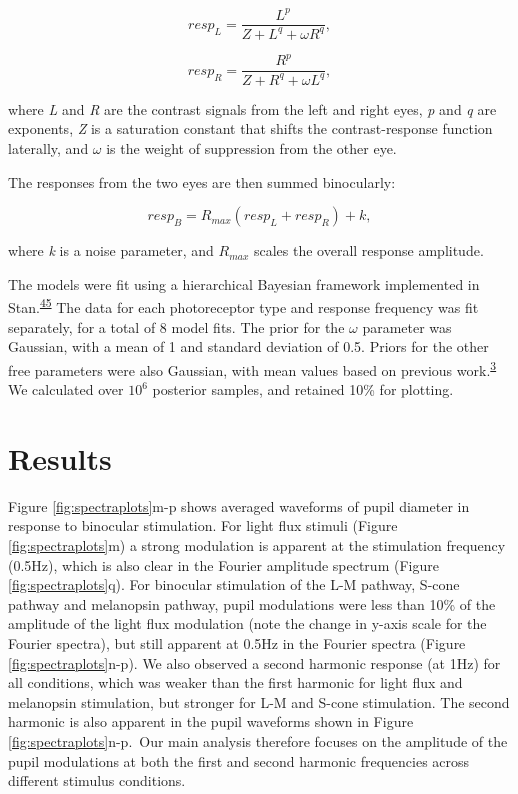 \documentclass[
]{article}
\begin{document}
\begin{equation}
\label{eq:respL}
resp_L = \frac{L^p}{Z + L^q + \omega R^q},
\end{equation}

\begin{equation}
\label{eq:respR}
resp_R = \frac{R^p}{Z + R^q + \omega L^q},
\end{equation}

\noindent where \emph{L} and \emph{R} are the contrast signals from the left and right eyes, \emph{p} and \emph{q} are exponents, \emph{Z} is a saturation constant that shifts the contrast-response function laterally, and \(\omega\) is the weight of suppression from the other eye.

The responses from the two eyes are then summed binocularly:

\begin{equation}
\label{eq:respB}
resp_B = R_{max}(resp_L + resp_R) + k,
\end{equation}

\noindent where \emph{k} is a noise parameter, and \(R_{max}\) scales the overall response amplitude.

The models were fit using a hierarchical Bayesian framework implemented in Stan.\textsuperscript{\protect\hyperlink{ref-Carpenter2017}{45}} The data for each photoreceptor type and response frequency was fit separately, for a total of 8 model fits. The prior for the \(\omega\) parameter was Gaussian, with a mean of 1 and standard deviation of 0.5. Priors for the other free parameters were also Gaussian, with mean values based on previous work.\textsuperscript{\protect\hyperlink{ref-Segala2023}{3}} We calculated over \ensuremath{10^{6}} posterior samples, and retained 10\% for plotting.

\hypertarget{results}{%
\section{Results}\label{results}}

Figure \ref{fig:spectraplots}m-p shows averaged waveforms of pupil diameter in response to binocular stimulation. For light flux stimuli (Figure \ref{fig:spectraplots}m) a strong modulation is apparent at the stimulation frequency (0.5Hz), which is also clear in the Fourier amplitude spectrum (Figure \ref{fig:spectraplots}q). For binocular stimulation of the L-M pathway, S-cone pathway and melanopsin pathway, pupil modulations were less than 10\% of the amplitude of the light flux modulation (note the change in y-axis scale for the Fourier spectra), but still apparent at 0.5Hz in the Fourier spectra (Figure \ref{fig:spectraplots}n-p). We also observed a second harmonic response (at 1Hz) for all conditions, which was weaker than the first harmonic for light flux and melanopsin stimulation, but stronger for L-M and S-cone stimulation. The second harmonic is also apparent in the pupil waveforms shown in Figure \ref{fig:spectraplots}n-p.~Our main analysis therefore focuses on the amplitude of the pupil modulations at both the first and second harmonic frequencies across different stimulus conditions.
\end{document}
